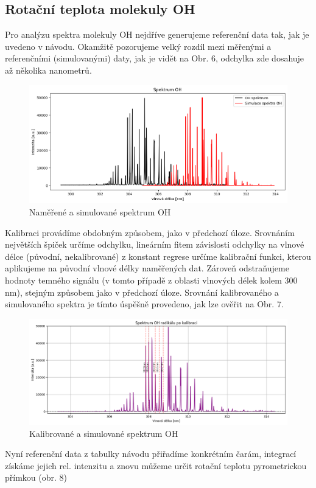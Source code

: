 \documentclass[czech,11pt,a4paper]{article}
\begin{document}
\begin{multicols}{2}
		\subsection{Rotační teplota molekuly OH}
		Pro analýzu spektra molekuly OH nejdříve generujeme referenční data tak, jak je uvedeno v návodu. Okamžitě pozorujeme velký rozdíl mezi měřenými a referenčními (simulovanými) daty, jak je vidět na Obr. 6, odchylka zde dosahuje až několika nanometrů.
		\begin{figure}[H]
			\centering
			\includegraphics[width=0.9\linewidth]{srovnani}
			\caption{Naměřené a simulované spektrum OH}			
		\end{figure}
		Kalibraci provádíme obdobným způsobem, jako v předchozí úloze. Srovnáním největších špiček určíme odchylku, lineárním fitem závislosti odchylky na vlnové délce (původní, nekalibrované) z konstant regrese určíme kalibrační funkci, kterou aplikujeme na původní vlnové délky naměřených dat. Zároveň odstraňujeme hodnoty temného signálu (v tomto případě z oblasti vlnových délek kolem 300 nm), stejným způsobem jako v předchozí úloze. Srovnání kalibrovaného a simulovaného spektra je tímto úspěšně provedeno, jak lze ověřit na Obr. 7.
		\begin{figure}[H]
			\centering
			\includegraphics[width=0.9\linewidth]{Spectrum4}
			\caption{Kalibrované a simulované spektrum OH}			
		\end{figure}
		Nyní referenční data z tabulky návodu přiřadíme konkrétním čarám, integrací získáme jejich rel. intenzitu a znovu můžeme určit rotační teplotu pyrometrickou přímkou (obr. 8)

\end{multicols}
\end{document}
